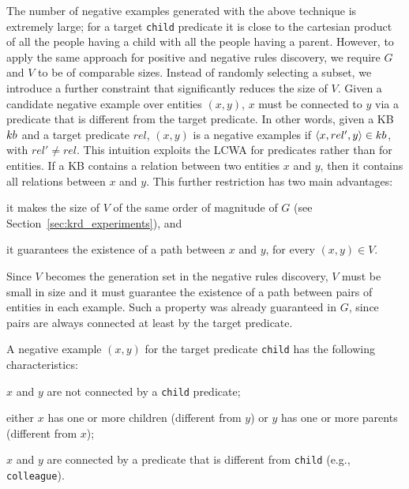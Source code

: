 The number of negative examples generated with the above technique is extremely large; for a target \texttt{child} predicate it is close to the cartesian product of all the people having a child with all the people having a parent. 
However, to apply the same approach for positive and negative rules discovery, we require $G$ and $V$ to be of comparable sizes. 
Instead of randomly selecting a subset, we introduce a further constraint that significantly reduces the size of $V$. Given a candidate negative example over entities $(x,y)$, $x$ must be connected to $y$ via a predicate that is different from the target predicate. In other words, given a KB ${\sc kb}$ and a target predicate $rel$, $(x,y)$ is a negative examples if $\langle x,rel',y\rangle \in {\sc kb}$, with $rel' \neq rel$. This intuition exploits the LCWA for predicates rather than for entities. If a KB contains a relation between two entities $x$ and $y$, then it contains all relations between $x$ and $y$.
This further restriction has two main advantages: 
\begin{inparaenum}[(i)]
	\item it makes the size of $V$ of the same order of magnitude of $G$ (see Section~\ref{sec:krd_experiments}), and 
	\item it guarantees the existence of a path between $x$ and $y$, for every $(x,y) \in V$. 
\end{inparaenum}
Since $V$ becomes the generation set in the negative rules discovery, $V$ must be small in size and it must guarantee the existence of a path between pairs of entities in each example. 
Such a property was already guaranteed in $G$, since pairs are always connected at least by the target predicate.



\begin{example}
	A negative example $(x,y)$ for the target predicate \texttt{child} has the following characteristics:
	\begin{inparaenum}[\itshape(i)]
		\item $x$ and $y$ are not connected by a \texttt{child} predicate;
		\item either $x$ has one or more children (different from $y$) or $y$ has one or more parents (different from $x$);
		\item $x$ and $y$ are connected by a predicate that is different from \texttt{child} (e.g., \texttt{colleague}).
	\end{inparaenum}
\end{example}

